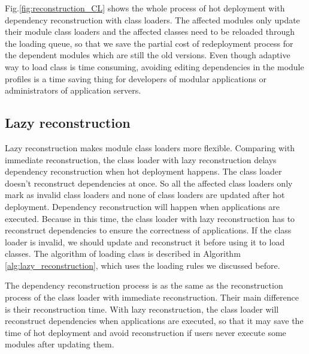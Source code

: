 \documentclass[conference]{IEEEtran}
\begin{document}
Fig.\ref{fig:reconstruction_CL} shows the whole process of hot deployment with dependency reconstruction with class loaders. 
The affected modules only update their module class loaders and the affected classes need to be reloaded through the loading queue, so that we save the partial cost of redeployment process for the dependent modules which are still the old versions. 
Even though adaptive way to load class is time consuming, avoiding editing dependencies in the module profiles is a time saving thing for developers of modular applications or administrators of application servers.


\subsection{Lazy reconstruction}

Lazy reconstruction makes module class loaders more flexible.
Comparing with immediate reconstruction, the class loader with lazy reconstruction delays dependency reconstruction when hot deployment happens.
The class loader doesn't reconstruct dependencies at once. 
So all the affected class loaders only mark as invalid class loaders and none of class loaders are updated after hot deployment.
Dependency reconstruction will happen when applications are executed.
Because in this time, the class loader with lazy reconstruction has to reconstruct dependencies to ensure the correctness of applications.
If the class loader is invalid, we should update and reconstruct it before using it to load classes. 
The algorithm of loading class is described in Algorithm \ref{alg:lazy_reconstruction}, which uses the loading rules we discussed before.

The dependency reconstruction process is as the same as the reconstruction process of the class loader with immediate reconstruction.
Their main difference is their reconstruction time.
With lazy reconstruction, the class loader will reconstruct dependencies when applications are executed, so that it may save the time of hot deployment and avoid reconstruction if users never execute some modules after updating them.
\end{document}
